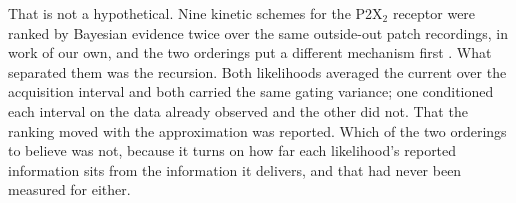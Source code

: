 That is not a hypothetical. Nine kinetic schemes for the P2X$_2$ receptor were ranked by Bayesian
evidence twice over the same outside-out patch recordings, in work of our own, and the two orderings
put a different mechanism first \citep{moffatt2025bayesian}. What separated them was the recursion. Both
likelihoods averaged the current over the acquisition interval and both carried the same gating
variance; one conditioned each interval on the data already observed and the other did not. That the
ranking moved with the approximation was reported. Which of the two orderings to believe was not,
because it turns on how far each likelihood's reported information sits from the information it
delivers, and that had never been measured for either.
%

